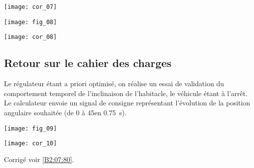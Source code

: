 \ifprof
\begin{corrige}
\begin{center}
\texttt{[image: cor\_07]}
\end{center}
\end{corrige}
\else
\fi
\begin{center}
\texttt{[image: fig\_08]}
\end{center}


\ifprof
\begin{corrige}
\begin{center}
\texttt{[image: cor\_08]}
\end{center}
\end{corrige}
\else
\fi

\subsection*{Retour sur le cahier des charges}
Le régulateur étant a priori optimisé, on réalise un essai de validation du comportement temporel de l'inclinaison de l'habitacle, le véhicule étant à l'arrêt. Le calculateur envoie un signal de consigne représentant l'évolution de la position angulaire souhaitée (de 0 à 45\degres en \SI{0,75}{s}). 

\begin{center}
\texttt{[image: fig\_09]}
\end{center}

\ifprof
\begin{corrige}
\begin{center}
\texttt{[image: cor\_10]}
\end{center}

\end{corrige}
\else
\fi



\ifprof
\else
\begin{flushright}
\footnotesize{Corrigé  voir \ref{B2:07:80}.}
\end{flushright}%
\fi